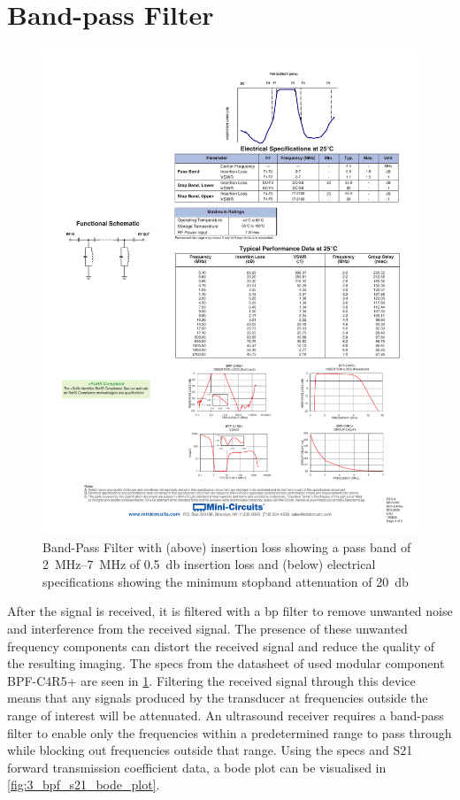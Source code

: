 \section{Band-pass Filter}
\begin{figure}[htbp]
	\centering
	\includegraphics[width=\textwidth]{Figures/3_bpf_specs.pdf}
	\caption[Band-Pass Filter insertion loss and specifications]{Band-Pass Filter with (above) insertion loss showing a pass band of \qtyrange{2}{7}{\mega\hertz} of \qty{0.5}{\decibel} insertion loss and (below) electrical specifications showing the minimum stopband attenuation of \qty{20}{\decibel} \cite{BPF}}
	\label{fig:3_bpf_specs}
\end{figure}
After the signal is received, it is filtered with a \gls{bp} filter to remove unwanted noise and interference from the received signal. The presence of these unwanted frequency components can distort the received signal and reduce the quality of the resulting imaging. The specs from the datasheet of used modular component BPF-C4R5+ \cite{BPF} are seen in \cref{fig:3_bpf_specs}. Filtering the received signal through this device means that any signals produced by the transducer at frequencies outside the range of interest will be attenuated. An ultrasound receiver requires a band-pass filter to enable only the frequencies within a predetermined range to pass through while blocking out frequencies outside that range. Using the specs and S21 forward transmission coefficient data, a bode plot can be visualised in \cref{fig:3_bpf_s21_bode_plot}.

